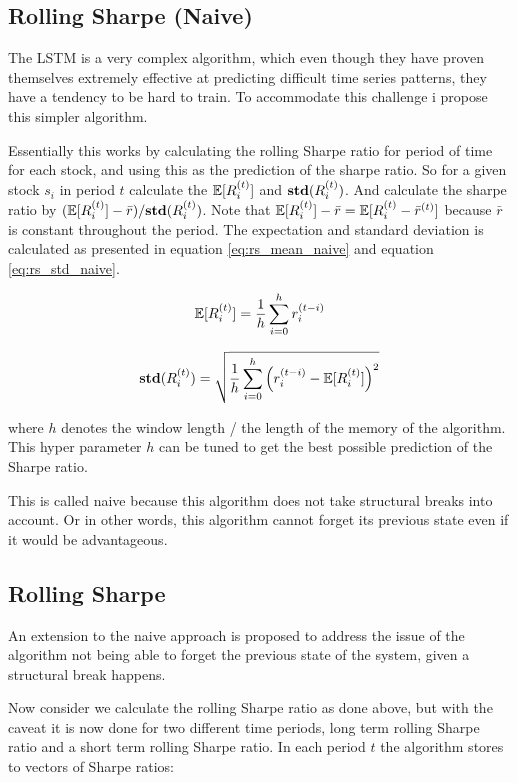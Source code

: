 \subsection{Rolling Sharpe (Naive)}

The LSTM is a very complex algorithm, which even though they have proven themselves extremely effective at predicting difficult time series patterns, they have a tendency to be hard to train. To accommodate this challenge i propose this simpler algorithm.

Essentially this works by calculating the rolling Sharpe ratio for period of time for each stock, and using this as the prediction of the sharpe ratio. So for a given stock $s_i$ in period $t$ calculate the $\mathbb{E}[R_{i}^{(t)}]$ and $\mathbf{std}({R_{i}^{(t)}})$. And calculate the sharpe ratio by $(\mathbb{E}[R_{i}^{(t)}] - \bar{r}) / \mathbf{std}({R_{i}^{(t)}})$. Note that $\mathbb{E}[R_{i}^{(t)}] - \bar{r} = \mathbb{E}[R_{i}^{(t)} -\bar{r}^{(t)}]$ because $\bar{r}$ is constant throughout the period. The expectation and standard deviation is calculated as presented in equation \ref{eq:rs_mean_naive} and equation \ref{eq:rs_std_naive}.

\begin{equation}\label{eq:rs_mean_naive}
    \mathbb{E}[R_{i}^{(t)}] = \frac{1}{h}\sum_{i=0}^{h} r_{i}^{(t-i)}
\end{equation}

\begin{equation}\label{eq:rs_std_naive}
    \mathbf{std} (R_{i}^{(t)})  = \sqrt{\frac{1}{h}\sum_{i=0}^{h} \left( r_{i}^{(t-i)} - \mathbb{E}[R_{i}^{(t)}] \right)^{2}}
\end{equation}

where $h$ denotes the window length / the length of the memory of the algorithm. This hyper parameter $h$ can be tuned to get the best possible prediction of the Sharpe ratio.

This is called naive because this algorithm does not take structural breaks into account. Or in other words, this algorithm cannot forget its previous state even if it would be advantageous.

\subsection{Rolling Sharpe}

An extension to the naive approach is proposed to address the issue of the algorithm not being able to forget the previous state of the system, given a structural break happens.

Now consider we calculate the rolling Sharpe ratio as done above, but with the caveat it is now done for two different time periods, long term rolling Sharpe ratio and a short term rolling Sharpe ratio. In each period $t$ the algorithm stores to vectors of Sharpe ratios:


